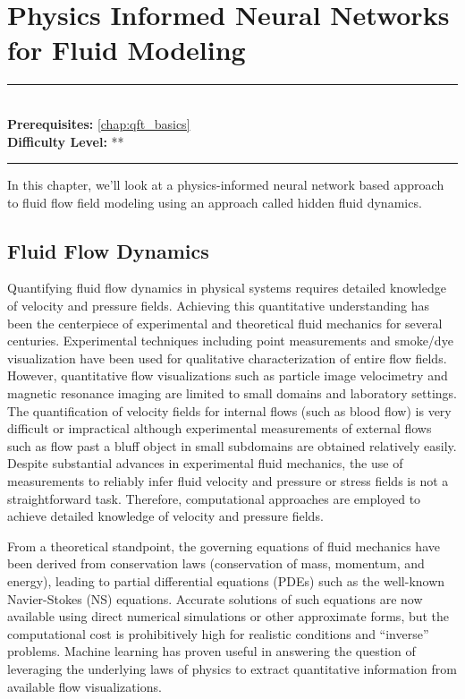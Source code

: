 \documentclass[book.tex]{subfiles}
\begin{document}

\chapter{Physics Informed Neural Networks for Fluid Modeling}

\label{chap:pinns_fluid}
\noindent\rule{11cm}{0.4pt} \\
\textbf{Prerequisites:} \autoref{chap:qft_basics}  \\
\textbf{Difficulty Level:} ** \\
\noindent\rule{11cm}{0.4pt}
\vspace{5mm}

In this chapter, we'll look at a physics-informed neural network based approach to fluid flow field modeling using an approach called hidden fluid dynamics.

\section{Fluid Flow Dynamics}

Quantifying fluid flow dynamics in physical systems requires detailed knowledge of velocity and pressure fields. Achieving this quantitative understanding has been the centerpiece of experimental and theoretical fluid mechanics for several centuries. Experimental techniques including point measurements and smoke/dye visualization have been used for qualitative characterization of entire flow fields. However, quantitative flow visualizations such as particle image velocimetry and magnetic resonance imaging are limited to small domains and laboratory settings. The quantification of velocity fields for internal flows (such as blood flow) is very difficult or impractical although experimental measurements of external flows such as flow past a bluff object in small subdomains are obtained relatively easily. Despite substantial advances in experimental fluid mechanics, the use of measurements to reliably infer fluid velocity and pressure or stress fields is not a straightforward
task. Therefore, computational approaches are employed to achieve detailed knowledge of velocity and pressure fields. 

From a theoretical standpoint, the governing equations of fluid mechanics
have been derived from conservation laws (conservation of mass, momentum, and energy), leading to partial differential equations (PDEs) such as the well-known Navier-Stokes (NS) equations. Accurate solutions of such equations are now available using direct numerical simulations or other approximate forms, but the computational cost is prohibitively high for realistic conditions and “inverse” problems. Machine learning has proven useful in answering the question of leveraging the underlying laws of physics to extract quantitative information from available flow visualizations.
\end{document}
